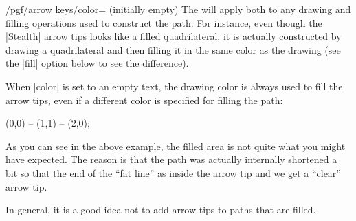 \begin{key}{/pgf/arrow keys/color= (initially \normalfont empty)}
    The  will apply both to any drawing and filling operations used
    to construct the path. For instance, even though the |Stealth| arrow tips
    looks like a filled quadrilateral, it is actually constructed by drawing a
    quadrilateral and then filling it in the same color as the drawing (see the
    |fill| option below to see the difference).

    When |color| is set to an empty text, the drawing color is always used to
    fill the arrow tips, even if a different color is specified for filling the
    path:
\begin{codeexample}[width=3cm]
 \draw [draw=red, fill=red!50, arrows = {-Stealth[length=10pt]}]
                          (0,0) -- (1,1) -- (2,0);
\end{codeexample}
    As you can see in the above example, the filled area is not quite what you
    might have expected. The reason is that the path was actually internally
    shortened a bit so that the end of the ``fat line'' as inside the arrow tip
    and we get a ``clear'' arrow tip.

    In general, it is a good idea not to add arrow tips to paths that are
    filled.
\end{key}

